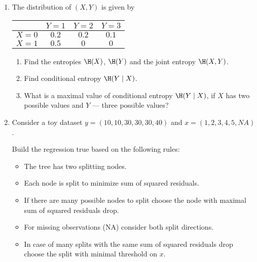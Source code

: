 \documentclass[12pt]{article}
\begin{document}

\begin{enumerate}
    \item The distribution of $(X, Y)$ is given by
    \begin{center}
        \begin{tabular}{lccc}
            \toprule
                & $Y = 1$  & $Y = 2$  & $Y = 3$ \\
            \midrule
            $X = 0$ & $0.2$  & $0.2$  & $0.1$ \\
            $X = 1$ & $0.5$  &  $0$   & $0$ \\
          \bottomrule
        \end{tabular}
    \end{center}
    \begin{enumerate}
        \item Find the entropies $\H(X)$, $\H(Y)$ and the joint entropy $\H(X, Y)$.
        \item Find conditional entropy $\H(Y \mid X)$.
        \item What is a maximal value of conditional entropy $\H(Y \mid X)$, 
        if $X$ has two possible values and $Y$ — three possible values?
    \end{enumerate}
    
    
    \item Consider a toy dataset $y = (10, 10, 30, 30, 30, 40)$ and $x = (1, 2, 3, 4, 5, NA)$.
    
    Build the regression true based on the following rules:
        \begin{itemize}
            \item The tree has two splitting nodes.
            \item Each node is split to minimize sum of squared residuals. 
            \item If there are many possible nodes to split choose the node with maximal sum of squared residuals drop.
            \item For missing observations (NA) consider both split directions. 
            \item In case of many splits with the same sum of squared residuals drop choose the split with minimal threshold on $x$.
        \end{itemize}
        


\end{enumerate}
\end{document}
